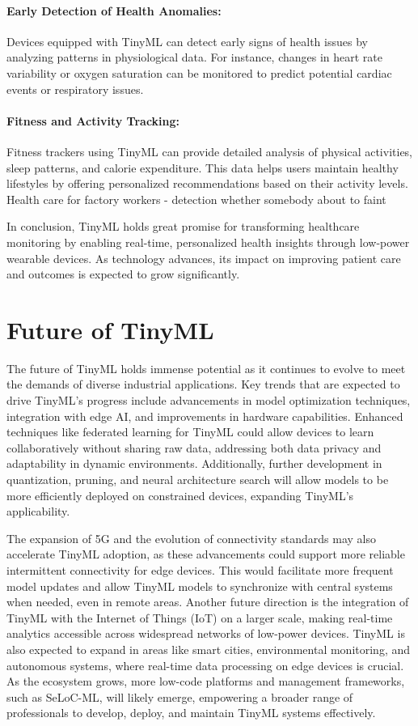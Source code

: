 \documentclass[twocolumn]{article}
\begin{document}
\paragraph{Early Detection of Health Anomalies:}Devices equipped with TinyML can detect early signs of health issues by analyzing patterns in physiological data. For instance, changes in heart rate variability or oxygen saturation can be monitored to predict potential cardiac events or respiratory issues.
\paragraph{Fitness and Activity Tracking:}
Fitness trackers using TinyML can provide detailed analysis of physical activities, sleep patterns, and calorie expenditure. This data helps users maintain healthy lifestyles by offering personalized recommendations based on their activity levels.
Health care for factory workers - detection whether somebody about to faint

In conclusion, TinyML holds great promise for transforming healthcare monitoring by enabling real-time, personalized health insights through low-power wearable devices. As technology advances, its impact on improving patient care and outcomes is expected to grow significantly.



\section{Future of TinyML }
\label{future_of_tinyml}

The future of TinyML holds immense potential as it continues to evolve to meet the demands of diverse industrial applications. Key trends that are expected to drive TinyML's progress include advancements in model optimization techniques, integration with edge AI, and improvements in hardware capabilities. Enhanced techniques like federated learning for TinyML could allow devices to learn collaboratively without sharing raw data, addressing both data privacy and adaptability in dynamic environments. Additionally, further development in quantization, pruning, and neural architecture search will allow models to be more efficiently deployed on constrained devices, expanding TinyML’s applicability.

The expansion of 5G and the evolution of connectivity standards may also accelerate TinyML adoption, as these advancements could support more reliable intermittent connectivity for edge devices. This would facilitate more frequent model updates and allow TinyML models to synchronize with central systems when needed, even in remote areas. Another future direction is the integration of TinyML with the Internet of Things (IoT) on a larger scale, making real-time analytics accessible across widespread networks of low-power devices. TinyML is also expected to expand in areas like smart cities, environmental monitoring, and autonomous systems, where real-time data processing on edge devices is crucial. As the ecosystem grows, more low-code platforms and management frameworks, such as SeLoC-ML, will likely emerge, empowering a broader range of professionals to develop, deploy, and maintain TinyML systems effectively.
\end{document}
